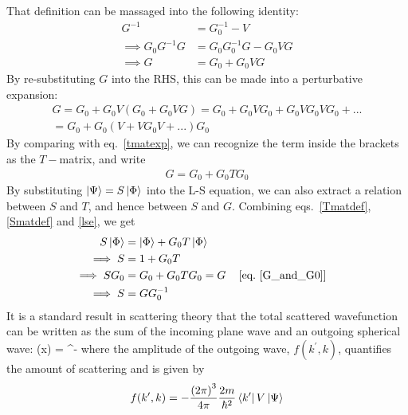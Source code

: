 \documentclass[12pt,twoside]{report}
\numberwithin{equation}{section}
\begin{document}
That definition can be massaged into the following identity:
\begin{equation}\begin{aligned}
	\label{GinVG}
	G^{-1} &= G_0^{-1} - V\\
	\implies G_0 G^{-1} G &= G_0 G_0^{-1} G - G_0 V G\\
	\implies G &= G_0 + G_0 V G
\end{aligned}\end{equation}
By re-substituting \(G\) into the RHS, this can be made into a perturbative expansion:
\begin{equation}\begin{aligned}
	G = G_0 + G_0 V \left(G_0 + G_0 V G\right) = G_0 + G_0 V G_0 + G_0 V G_0 V G_0 + ... \\
	= G_0 + G_0 \left( V + V G_0 V + ... \right) G_0
\end{aligned}\end{equation}
By comparing with eq.~\ref{tmatexp}, we can recognize the term inside the brackets as the \(T-\)matrix, and write
\begin{equation}\begin{aligned}
	G = G_0 + G_0 T G_0
	\label{G_and_G0}
\end{aligned}\end{equation}
By substituting \(\ket{\Psi} = S\ket{\Phi}\) into the L-S equation, we can also extract a relation between \(S\) and \(T\), and hence between \(S\) and \(G\). Combining eqs.~\ref{Tmatdef},\ref{Smatdef} and \ref{lse}, we get
\begin{align}
	S\ket{\Phi} &= \ket{\Phi} + G_0 T\ket{\Phi}\\
	\implies S &= 1 + G_0 T\\
	\implies SG_0 &= G_0 + G_0 T G_0 = G && \left[\text{eq.~\ref{G_and_G0}}\right]\\
	\implies S &= G  G_0^{-1} \label{SinG}
\end{align}
It is a standard result in scattering theory that the total scattered wavefunction can be written as the sum of the incoming plane wave and an outgoing spherical wave:
\beq
\Psi(x) = \rr{2\pi}^{-}
\eeq
where the amplitude of the outgoing wave, \(f(k^\prime,k)\), quantifies the amount of scattering and is given by
\begin{equation}\begin{aligned}
	f(k^\prime, k) = - \frac{\left( 2\pi \right) ^3}{4\pi} \frac{2m}{\hbar^2}\bra{k^\prime}V\ket{\Psi}
\end{aligned}\end{equation}
\end{document}
